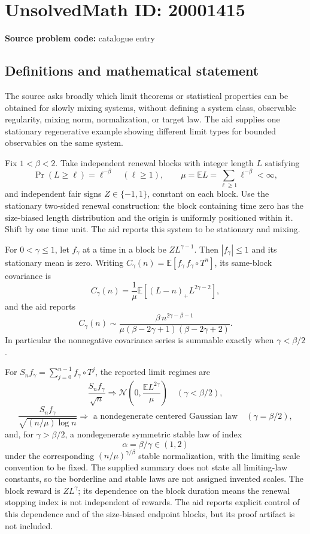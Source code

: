 \documentclass[11pt]{article}
\newcommand{\E}{\mathbb{E}}
\begin{document}
\section*{UnsolvedMath ID: 20001415}
\textbf{Source problem code:} catalogue entry
\subsection{Definitions and mathematical statement}
The source asks broadly which limit theorems or statistical properties can be obtained for slowly mixing systems, without defining a system class, observable regularity, mixing norm, normalization, or target law. The aid supplies one stationary regenerative example showing different limit types for bounded observables on the same system.

Fix \(1<\beta<2\). Take independent renewal blocks with integer length \(L\) satisfying
\[
 \Pr(L\ge\ell)=\ell^{-\beta}\quad(\ell\ge1),\qquad
 \mu=\E L=\sum_{\ell\ge1}\ell^{-\beta}<\infty,
\]
and independent fair signs \(Z\in\{-1,1\}\), constant on each block. Use the stationary two-sided renewal construction: the block containing time zero has the size-biased length distribution and the origin is uniformly positioned within it. Shift by one time unit. The aid reports this system to be stationary and mixing.

For \(0<\gamma\le1\), let \(f_\gamma\) at a time in a block be \(ZL^{\gamma-1}\). Then \(|f_\gamma|\le1\) and its stationary mean is zero. Writing \(C_\gamma(n)=\E[f_\gamma\,f_\gamma\circ T^n]\), its same-block covariance is
\[
 C_\gamma(n)=\frac1\mu\E[(L-n)_+L^{2\gamma-2}],
\]
and the aid reports
\[
 C_\gamma(n)\sim
 \frac{\beta\,n^{2\gamma-\beta-1}}
 {\mu(\beta-2\gamma+1)(\beta-2\gamma+2)}.
\]
In particular the nonnegative covariance series is summable exactly when \(\gamma<\beta/2\).

For \(S_nf_\gamma=\sum_{j=0}^{n-1}f_\gamma\circ T^j\), the reported limit regimes are
\[
 \frac{S_nf_\gamma}{\sqrt n}\Longrightarrow
 \mathcal N\left(0,\frac{\E L^{2\gamma}}\mu\right)
 \quad(\gamma<\beta/2),
\]
\[
 \frac{S_nf_\gamma}{\sqrt{(n/\mu)\log n}}
 \Longrightarrow\text{ a nondegenerate centered Gaussian law}
 \quad(\gamma=\beta/2),
\]
and, for \(\gamma>\beta/2\), a nondegenerate symmetric stable law of index
\[
 \alpha=\beta/\gamma\in(1,2)
\]
under the corresponding \((n/\mu)^{\gamma/\beta}\) stable normalization, with the limiting scale convention to be fixed. The supplied summary does not state all limiting-law constants, so the borderline and stable laws are not assigned invented scales. The block reward is \(ZL^\gamma\); its dependence on the block duration means the renewal stopping index is not independent of rewards. The aid reports explicit control of this dependence and of the size-biased endpoint blocks, but its proof artifact is not included.
\end{document}
